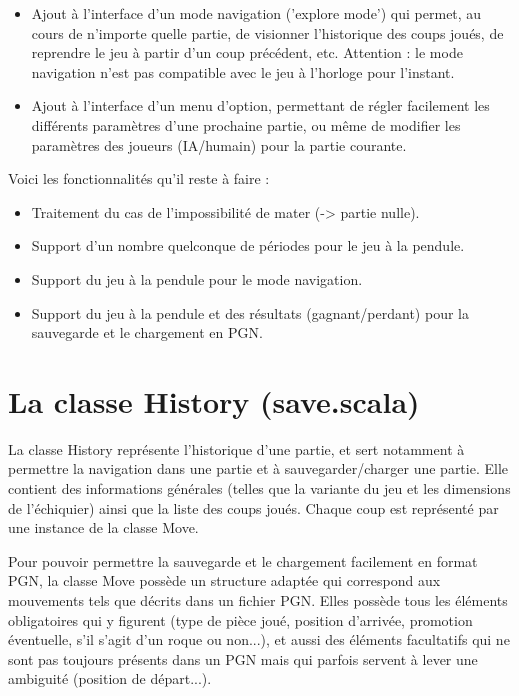 \documentclass[11pt]{article}
\begin{document}
\begin{itemize}
\item Ajout à l'interface d'un mode navigation ('explore mode') qui permet, au cours de n'importe quelle partie, de visionner l'historique des coups joués, de reprendre le jeu à partir d'un coup précédent, etc. Attention : le mode navigation n'est pas compatible avec le jeu à l'horloge pour l'instant.

\item Ajout à l'interface d'un menu d'option, permettant de régler facilement les différents paramètres d'une prochaine partie, ou même de modifier les paramètres des joueurs (IA/humain) pour la partie courante.
\end{itemize}
\-

Voici les fonctionnalités qu'il reste à faire :\newline
\begin{itemize}
\item Traitement du cas de l'impossibilité de mater (-> partie nulle).
\item Support d'un nombre quelconque de périodes pour le jeu à la pendule.
\item Support du jeu à la pendule pour le mode navigation.
\item Support du jeu à la pendule et des résultats (gagnant/perdant) pour la sauvegarde et le chargement en PGN.
\end{itemize}
\-

\section{La classe History (save.scala)}

La classe History représente l'historique d'une partie, et sert notamment à permettre la navigation dans une partie et à sauvegarder/charger une partie. Elle contient des informations générales (telles que la variante du jeu et les dimensions de l'échiquier) ainsi que la liste des coups joués. Chaque coup est représenté par une instance de la classe Move.

Pour pouvoir permettre la sauvegarde et le chargement facilement en format PGN, la classe Move possède un structure adaptée qui correspond aux mouvements tels que décrits dans un fichier PGN. Elles possède tous les éléments obligatoires qui y figurent (type de pièce joué, position d'arrivée, promotion éventuelle, s'il s'agit d'un roque ou non...), et aussi des éléments facultatifs qui ne sont pas toujours présents dans un PGN mais qui parfois servent à lever une ambiguité (position de départ...).\newline
\end{document}
